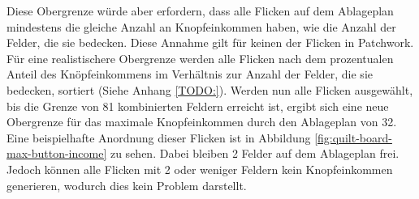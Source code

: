 Diese Obergrenze würde aber erfordern, dass alle Flicken auf dem Ablageplan mindestens die gleiche Anzahl an Knopfeinkommen haben, wie die Anzahl der Felder, die sie bedecken. Diese Annahme gilt für keinen der Flicken in Patchwork. Für eine realistischere Obergrenze werden alle Flicken nach dem prozentualen Anteil des Knöpfeinkommens im Verhältnis zur Anzahl der Felder, die sie bedecken, sortiert (Siehe Anhang \ref{TODO:}). Werden nun alle Flicken ausgewählt, bis die Grenze von 81 kombinierten Feldern erreicht ist, ergibt sich eine neue Obergrenze für das maximale Knopfeinkommen durch den Ablageplan von 32. Eine beispielhafte Anordnung dieser Flicken ist in Abbildung \ref{fig:quilt-board-max-button-income} zu sehen. Dabei bleiben 2 Felder auf dem Ablageplan frei. Jedoch können alle Flicken mit 2 oder weniger Feldern kein Knopfeinkommen generieren, wodurch dies kein Problem darstellt.

